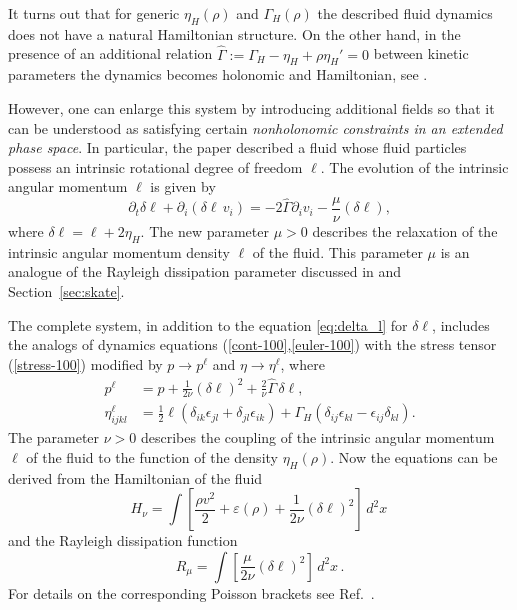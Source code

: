 \documentclass[11pt]{article}
\theoremstyle{definition}
\newcounter{ai}
\begin{document}
It turns out that for generic $\eta_H(\rho)$ and $\Gamma_H(\rho)$ 
the described fluid dynamics does not have a natural Hamiltonian structure. 
On the other hand, in the presence of
an additional relation $\hat\Gamma:=\Gamma_H - \eta_H +\rho \eta_H'=0$  between kinetic parameters 
the dynamics becomes holonomic and Hamiltonian, see  \cite{monteiro2023hamiltonian}.
\medskip



However,  one can enlarge this system by introducing additional fields 
so that it can be understood as satisfying certain {\it nonholonomic constraints in an extended phase space}. 
In particular, the paper \cite{monteiro2023hamiltonian} described a fluid whose fluid particles possess an intrinsic rotational degree of freedom $\ell$. The evolution of the intrinsic angular momentum $\ell$  is given by 
 \begin{equation}\label{eq:delta_l}
  \partial_t \delta\ell +\partial_i(\delta\ell\, v_i) = -2\hat\Gamma \partial_i v_i - \frac{\mu}{\nu} (\delta \ell),     
 \end{equation}
 where 
  $   \delta\ell = \ell +2\eta_H$. 
The new parameter $\mu>0$ describes the relaxation of the intrinsic angular momentum density $\ell$ of the fluid. This parameter $\mu$ is an analogue of the Rayleigh dissipation parameter discussed in
\cite{kozlov1992problem} and Section~\ref{sec:skate}.

The complete system, in addition to the equation \eqref{eq:delta_l} for $\delta\ell$, includes the analogs of dynamics equations  (\ref{cont-100},\ref{euler-100}) with the stress tensor (\ref{stress-100}) modified by $p\to  p^\ell$ and $\eta\to \eta^\ell$, where
\begin{align}
      p^\ell &= p +\frac{1}{2\nu}(\delta \ell)^2 +\frac{2}{\nu}\hat\Gamma\,\delta \ell,
 \label{pell-200}\\
    \eta^\ell_{ijkl} &= \frac{1}{2}\ell (\delta_{ik}\epsilon_{jl}+\delta_{jl}\epsilon_{ik}) +\Gamma_H(\delta_{ij}\epsilon_{kl}-\epsilon_{ij}\delta_{kl}).
 \label{etaell-200}
\end{align}
The parameter $\nu>0$ describes the coupling of the intrinsic angular momentum  $\ell$ of the fluid to the function of the density $\eta_H(\rho)$. Now the equations can be derived from the Hamiltonian of the fluid 
 $$  H_\nu =\int  \left[\frac{\rho v^2}{2} +\varepsilon(\rho) +\frac{1}{2\nu} (\delta \ell)^2\right]\,d^2x\,
$$ 
and the Rayleigh dissipation function
$$
    R_\mu = \int \left[\frac{\mu}{2\nu}  (\delta\ell)^2\right] \,d^2x \,.
$$
For details on the corresponding Poisson brackets see Ref.~\cite{monteiro2023hamiltonian}.
\smallskip
\end{document}
